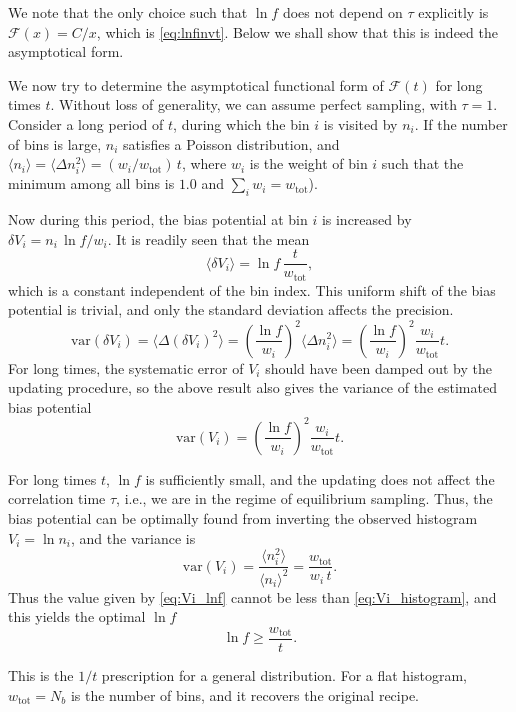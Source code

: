 \documentclass[aip,jcp,preprint,notitlepage, superscriptaddress]{revtex4-1}
\begin{document}
We note that the only choice
such that $\ln f$ does not depend on $\tau$ explicitly
is $\mathcal F(x) = C/x$, which is \eqref{eq:lnfinvt}.
Below we shall show that this is indeed the asymptotical form.


We now try to determine the asymptotical functional form of
$\mathcal F(t)$ for long times $t$.
%
Without loss of generality,
we can assume perfect sampling, with $\tau = 1$.
%
Consider a long period of $t$, during which
the bin $i$ is visited by $n_i$.  If the number of bins is large,
$n_i$ satisfies a Poisson distribution, and
$\langle n_i \rangle = \langle \Delta n_i^2 \rangle = (w_i/w_\mathrm{tot}) \, t$,
where $w_i$ is the weight of bin $i$ such that the minimum among all bins is $1.0$
and $\sum_i w_i = w_\mathrm{tot}$).


Now during this period, the bias potential at bin $i$
is increased by $\delta V_i = n_i \, \ln f / w_i$.
It is readily seen that the mean
$$
\langle \delta V_i \rangle
=
\ln f \, \frac{ t } { w_\mathrm{tot} },
$$
which is a constant independent of the bin index.
%
This uniform shift of the bias potential is trivial,
and only the standard deviation affects the precision.
%
$$
\mathrm{var} (\delta V_i)
=
\langle \Delta (\delta V_i)^2 \rangle
=
\left( \frac{\ln f}{w_i} \right)^2 \langle \Delta n_i^2 \rangle
=
\left( \frac{\ln f}{w_i} \right)^2 \frac{w_i}{w_\mathrm{tot}} t.
$$
%
For long times, the systematic error of $V_i$ should have been damped out
by the updating procedure, so the above result also gives
the variance of the estimated bias potential
\begin{equation}
  \mathrm{var} ( V_i)
=
\left( \frac{\ln f}{w_i} \right)^2 \frac{w_i}{w_\mathrm{tot}} t.
\label{eq:Vi_lnf}
\end{equation}



For long times $t$, $\ln f$ is sufficiently small,
and the updating does not affect the correlation time $\tau$,
i.e., we are in the regime of equilibrium sampling.
%
Thus, the bias potential can be optimally found from inverting the observed histogram
$V_i = \ln n_i$, and the variance is
\begin{equation}
\mathrm{var} (V_i)
=
\frac{ \langle n_i^2 \rangle } { \langle n_i \rangle^2 }
=
\frac{ w_\mathrm{tot} } {w_i \, t}.
\label{eq:Vi_histogram}
\end{equation}
%
Thus the value given by \eqref{eq:Vi_lnf}
cannot be less than \eqref{eq:Vi_histogram},
and this yields
the optimal $\ln f$
\begin{equation}
  \ln f \ge \frac{ w_\mathrm{tot} } { t }.
\end{equation}

This is the $1/t$ prescription for a general distribution.
%
For a flat histogram, $w_\mathrm{tot} = N_b$
is the number of bins, and it recovers
the original recipe\cite{
belardinelli2007, belardinelli2008}.




\end{document}
